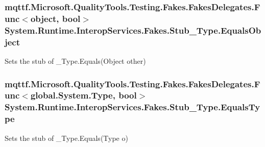 \hypertarget{class_system_1_1_runtime_1_1_interop_services_1_1_fakes_1_1_stub___type_a495649039bffed314ab09778b67890a7}{
\subsubsection[{Equals\-Object}]{\setlength{\rightskip}{0pt plus 5cm}mqttf.\-Microsoft.\-Quality\-Tools.\-Testing.\-Fakes.\-Fakes\-Delegates.\-Func$<$object, bool$>$ System.\-Runtime.\-Interop\-Services.\-Fakes.\-Stub\-\_\-\-Type.\-Equals\-Object}}\label{class_system_1_1_runtime_1_1_interop_services_1_1_fakes_1_1_stub___type_a495649039bffed314ab09778b67890a7}


Sets the stub of \-\_\-\-Type.\-Equals(\-Object other)

\hypertarget{class_system_1_1_runtime_1_1_interop_services_1_1_fakes_1_1_stub___type_a0ac24c6deba7472c904126b8ab8ecc84}{
\subsubsection[{Equals\-Type}]{\setlength{\rightskip}{0pt plus 5cm}mqttf.\-Microsoft.\-Quality\-Tools.\-Testing.\-Fakes.\-Fakes\-Delegates.\-Func$<$global.\-System.\-Type, bool$>$ System.\-Runtime.\-Interop\-Services.\-Fakes.\-Stub\-\_\-\-Type.\-Equals\-Type}}\label{class_system_1_1_runtime_1_1_interop_services_1_1_fakes_1_1_stub___type_a0ac24c6deba7472c904126b8ab8ecc84}


Sets the stub of \-\_\-\-Type.\-Equals(\-Type o)

